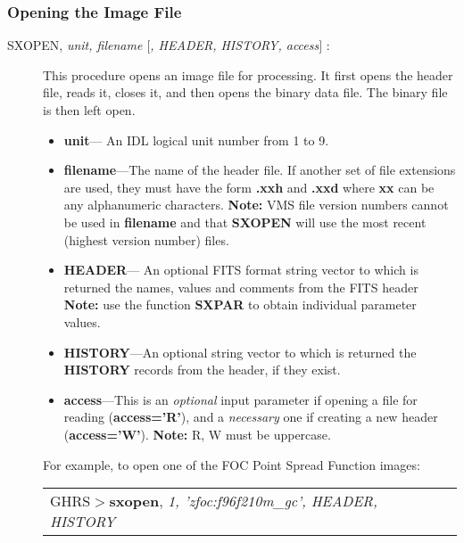 \subsubsection{\bf Opening the Image File}
\label{sxopen}
\begin{description}
\item [SXOPEN, {\it unit, filename $[$, HEADER, HISTORY, access$]$} : ]

This procedure opens an image file for processing. It first opens the 
header file, reads it, closes it, and then opens the binary data 
file.  The binary file is then left open.

\begin{itemize}

\item {\bf unit}---
An IDL logical unit number from 1 to 9.

\item {\bf filename}---The name of the header file.  If another set of
file extensions are used, they must have the form {\bf .xxh} and {\bf .xxd} 
where {\bf xx} can be any alphanumeric characters.  {\bf Note:} VMS file 
version numbers cannot be used in {\bf filename} and that {\bf SXOPEN} will use 
the most recent (highest version number) files.
\newpage
\item {\bf HEADER}---
An optional FITS format string vector to which is 
returned the names, values and comments from the FITS header 
{\bf Note:} use the function {\bf SXPAR} to obtain individual parameter values.

\item {\bf HISTORY}---An optional string vector to which is returned 
the {\bf HISTORY} records from the header, if they exist.

\item {\bf access}---This is an {\it optional} input parameter if opening a 
file for reading ({\bf access='R'}), and a {\it necessary} one if creating a 
new header ({\bf access='W'}).  {\bf Note:} R, W must be uppercase. 

\end{itemize}

\noindent
For example, to open one of the FOC Point Spread Function images:\\

\begin{tabular}{ll}
GHRS$>${\bf sxopen}, {\it 1, 'zfoc:f96f210m\_gc', HEADER, HISTORY} & \\ 
\end{tabular}


\end{description}

